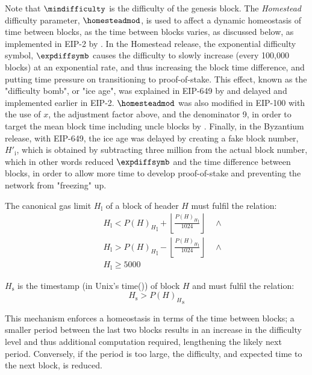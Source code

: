 \documentclass[9pt,oneside]{amsart}
\begin{document}
\begin{multicols}{2}
Note that $\mindifficulty$ is the difficulty of the genesis block. The \textit{Homestead} difficulty parameter, $\homesteadmod$, is used to affect a dynamic homeostasis of time between blocks, as the time between blocks varies, as discussed below, as implemented in EIP-2 by \cite{EIP-2}. In the Homestead release, the exponential difficulty symbol, $\expdiffsymb$ causes the difficulty to slowly increase (every 100,000 blocks) at an exponential rate, and thus increasing the block time difference, and putting time pressure on transitioning to proof-of-stake. This effect, known as the "difficulty bomb", or "ice age", was explained in EIP-649 by \cite{EIP-649} and delayed and implemented earlier in EIP-2. $\homesteadmod$ was also modified in EIP-100 with the use of $x$, the adjustment factor above, and the denominator 9, in order to target the mean block time including uncle blocks by \cite{EIP-100}. Finally, in the Byzantium release, with EIP-649, the ice age was delayed by creating a fake block number, $H'_{\mathrm{i}}$, which is obtained by subtracting three million from the actual block number, which in other words reduced $\expdiffsymb$ and the time difference between blocks, in order to allow more time to develop proof-of-stake and preventing the network from "freezing" up.

\hypertarget{block_gas_limit_H__l}{}The canonical gas limit $H_{\mathrm{l}}$ of a block of header $H$ must fulfil the relation:
\begin{eqnarray}
& & H_{\mathrm{l}} < {P(H)_{H}}_{\mathrm{l}} + \left\lfloor\frac{{P(H)_{H}}_{\mathrm{l}}}{1024}\right\rfloor \quad \wedge \\
& & H_{\mathrm{l}} > {P(H)_{H}}_{\mathrm{l}} - \left\lfloor\frac{{P(H)_{H}}_{\mathrm{l}}}{1024}\right\rfloor \quad \wedge \\
& & H_{\mathrm{l}} \geqslant 5000
\end{eqnarray}

\hypertarget{block_timestamp_H__s}{}$H_{\mathrm{s}}$ is the timestamp (in Unix's time()) of block $H$ and must fulfil the relation:
\begin{equation}
H_{\mathrm{s}} > {P(H)_{H}}_{\mathrm{s}}
\end{equation}

This mechanism enforces a homeostasis in terms of the time between blocks; a smaller period between the last two blocks results in an increase in the difficulty level and thus additional computation required, lengthening the likely next period. Conversely, if the period is too large, the difficulty, and expected time to the next block, is reduced.


\end{multicols}
\end{document}
